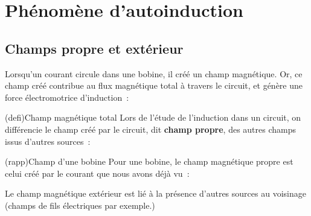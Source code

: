 \documentclass[../../main/main.tex]{subfiles}
\begin{document}
\section{Phénomène d'autoinduction}
\label{sec:autoind}

\subsection{Champs propre et extérieur}
\label{ssec:fpropre}
Lorsqu'un courant circule dans une bobine, il créé un champ magnétique. Or, ce
champ créé contribue au flux magnétique total à travers le circuit, et génère
une force électromotrice d'induction~:
\begin{tcb}(defi){Champ magnétique total}
	Lors de l'étude de l'induction dans un circuit, on différencie le champ créé
	par le circuit, dit \textbf{champ propre}, des autres champs issus d'autres
	sources~:
	\psw{%
		\[
			\boxed{\vv{B\ind{tot}} = \vv{B\ind{propre}} + \vv{B\ind{ext}}}
		\]
	}%
	\vspace*{-10pt}
\end{tcb}
\begin{tcb}(rapp){Champ d'une bobine}
	Pour une bobine, le champ magnétique propre est celui créé par le courant que
	nous avons déjà vu~:
	\psw{%
		\[
			\vv{B\ind{p}}(t) = \mu_0 \frac{N}{\ell }i(t)\,\uz
		\]
	}%
\end{tcb}

Le champ magnétique extérieur est lié à la présence d'autres sources au
voisinage (champs de fils électriques par exemple.)

\end{document}
